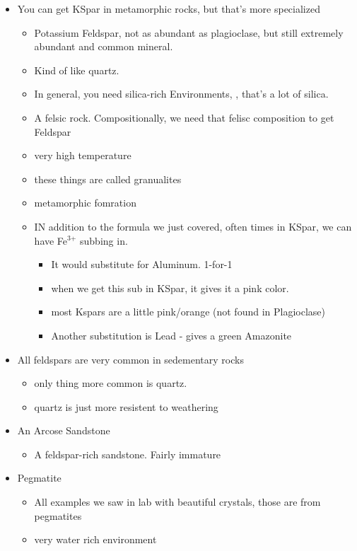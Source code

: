 \documentclass[11pt]{article}
\begin{document}
\begin{itemize}
\item You can get KSpar in metamorphic rocks, but that's more specialized
\begin{itemize}
\item Potassium Feldspar, not as abundant as plagioclase, but still extremely abundant and common mineral.
\item Kind of like quartz.
\item In general, you need silica-rich Environments, , that's a lot of silica.
\item A felsic rock. Compositionally, we need that felisc composition to get Feldspar
\item very high temperature
\item these things are called granualites
\item metamorphic fomration
\item IN addition to the formula we just covered, often times in KSpar, we can have Fe$^{\text{3+}}$ subbing in.
\begin{itemize}
\item It would substitute for Aluminum. 1-for-1
\item when we get this sub in KSpar, it gives it a pink color.
\item most Kspars are a little pink/orange (not found in Plagioclase)
\item Another substitution is Lead - gives a green Amazonite
\end{itemize}
\end{itemize}
\item All feldspars are very common in sedementary rocks
\begin{itemize}
\item only thing more common is quartz.
\item quartz is just more resistent to weathering
\end{itemize}
\item An Arcose Sandstone
\begin{itemize}
\item A feldspar-rich sandstone. Fairly immature
\end{itemize}
\item Pegmatite
\begin{itemize}
\item All examples we saw in lab with beautiful crystals, those are from pegmatites
\item very water rich environment
\end{itemize}

\end{itemize}
\end{document}
